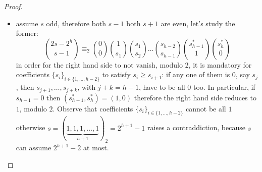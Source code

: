 \documentclass[11pt,a4paper]{article} %
\begin{document}
\begin{proof}
\begin{itemize}
\begin{itemize}
                \item assume $s$ odd, therefore both $s-1$ both $s+1$ are even, 
                    let's study the former:
                    \begin{displaymath}
                            {{2s-2^{h}}\choose{s-1}}  
                            \equiv_{2}
                            {{0}\choose{0}} 
                            {{1}\choose{s_{1}}}
                            {{s_{1}}\choose{s_{2}}}
                            \ldots
                            {{s_{h-2}}\choose{s_{h-1}}}
                            {{s_{h-1}^{*}}\choose{1}}
                            {{s_{h}^{*}}\choose{0}}
                    \end{displaymath}
                    in order for the right hand side to not vanish, modulo $2$,
                    it is mandatory for coefficients $\lbrace s_{i}\rbrace_{i\in\lbrace1,\ldots,h-2\rbrace}$
                    to satisfy $s_{i}\geq s_{i+1}$: if any one of them is $0$, say $s_{j}$, then
                    $s_{j+1},\ldots,s_{j+k}$, with $j+k=h-1$,
                    have to be all $0$ too. In particular, if $s_{h-1}=0$ then 
                    $(s_{h-1}^{*},s_{h}^{*})=(1,0)$
                    therefore the right hand side reduces to $1$, modulo $2$.
                    Observe that coefficients $\lbrace s_{i}\rbrace_{i\in\lbrace1,\ldots,h-2\rbrace}$
                    cannot be all $1$ otherwise 
                    $s=(\underbrace{1,1,1,\ldots,1}_{h+1})_{2}=2^{h+1}-1$ raises a contraddiction, because
                    $s$ can assume $2^{h+1}-2$ at most. 
                    

\end{itemize}
\end{itemize}
\end{proof}
\end{document}
